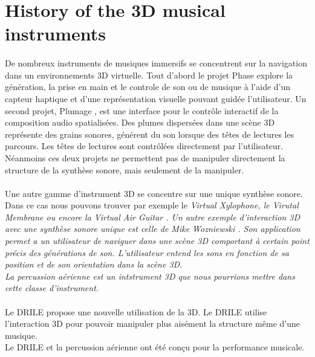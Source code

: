 \section{History of the 3D musical instruments}
\paragraph{}
De nombreux instruments de musiques immersifs se concentrent sur la navigation dans un environnements 3D virtuelle.
Tout d'abord le projet Phase \cite{rodet2005study} explore la génération, la prise en main et le controle de son ou de musique à l'aide d'un capteur haptique et d'une représentation visuelle pouvant guidée l'utilisateur.
Un second projet, Plumage \cite{plumage2007}, est une interface pour le contrôle interactif de la composition audio spatialisées. Des plumes dispersées dans une scène 3D représente des grains sonores, générent du son lorsque des têtes de lectures les parcours. Les têtes de lectures sont contrôlées directement par l'utilisateur.
Néanmoins ces deux projets ne permettent pas de manipuler directement la structure de la synthèse sonore, mais seulement de la manipuler.
\paragraph{}
Une autre gamme d'instrument 3D se concentre sur une unique synthèse sonore. Dans ce cas nous pouvons trouver par exemple le \it{Virtual Xylophone}, le \textit{Virutal Membrane} ou encore la \textit{Virtual Air Guitar} \cite{maki2005}. Un autre exemple d'interaction 3D avec une synthèse sonore unique est celle de Mike Wozniewski \cite{wozniewski2006spatial}. Son application permet a un utilisateur de naviguer dans une scène 3D comportant à certain point précis des générations de son. L'utilisateur entend les sons en fonction de sa position et de son orientation dans la scène 3D.
\\
La percussion aérienne est un intstrument 3D que nous pourrions mettre dans cette classe d'instrument.
\paragraph{}
Le DRILE propose une nouvelle utilisation de la 3D. Le DRILE utilise l'interaction 3D pour pouvoir manipuler plus aisément la structure même d'une musique.
\\
Le DRILE et la percussion aérienne ont été conçu pour la performance musicale.
